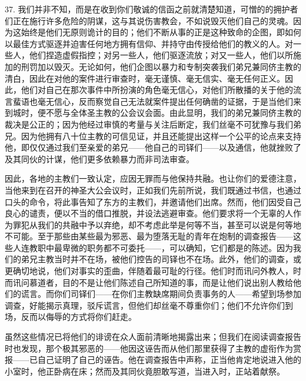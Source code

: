 37. 我们并非不知，而是在收到你们敬诚的信函之前就清楚知道，可憎的的拥护者们正在施行许多危险的阴谋，这与其说伤害教会，不如说毁灭他们自己的灵魂。因为这始终是他们无原则诡计的目的；他们不断从事的正是这种致命的企图，即如何以最佳方式驱逐并迫害任何地方拥有信仰、并持守由传授给他们的教义的人。对一些人，他们捏造虚假指控；对另一些人，他们驱逐流放；对又一些人，他们以所施加的刑罚加以毁灭。无论如何，他们企图以暴力和专制突袭我们弟兄兼同侪主教的清白，因此在对他的案件进行审查时，毫无谨慎、毫无信实、毫无任何正义。因此，他们对自己在那次事件中所扮演的角色毫无信心，对他们所散播的关于他的流言蜚语也毫无信心，反而察觉自己无法就案件提出任何确凿的证据，于是当他们来到城时，便不愿与全体圣主教的公会议会面。由此显明，我们的弟兄兼同侪主教的裁决是公正的；因为他经过审慎的考量与关注后断定，我们丝毫不可犹豫与我们弟兄。因为他拥有八十位主教的可信见证，并且还能提出这样一个公平的论点来支持他，即仅仅通过我们至亲爱的弟兄——他自己的司铎们——以及通信，他就挫败了及其同伙的计谋，他们更多依赖暴力而非司法审查。\par

因此，各地的主教们一致认定，应因无罪而与他保持共融。也让你们的爱德注意，当他来到在召开的神圣大公会议时，正如我们先前所说，我们既通过书信，也通过口头的命令，将此事告知了东方的主教们，并邀请他们出席。然而，他们因受自己良心的谴责，便以不当的借口推脱，并设法逃避审查。他们要求将一个无辜的人作为罪犯从我们的共融中予以弃绝，却不考虑此举是何等不当，甚至可以说是何等地不可能。至于那些由某些最为邪恶、最为堕落无耻的青年在炮制的调查报告——这些人连教职中最卑微的职务都不可委托——，可以确知，它们都是的陈述。因为我们的弟兄主教当时并不在场，被他们控告的司铎也不在场。此外，他们的调查，或更确切地说，他们对事实的歪曲，伴随着最可耻的行径。他们时而讯问外教人，时而讯问慕道者，目的不是让他们陈述自己所知道的事，而是让他们说出别人教给他们的谎言。而你们司铎们——在你们主教缺席期间负责事务的人——希望到场参加调查，好能揭示真理，驳斥谎言，但他们却丝毫不尊重你们；他们不允许你们到场，反而以侮辱的方式将你们赶走。\par

虽然这些情况已将他们的诽谤在众人面前清晰地揭露出来；但我们在阅读调查报告时也发现，那个极其邪恶的——他因这诬告而从他们那里获得了主教的虚衔作为赏报——已自己证明了自己的诬告。他在调查报告中声称，正当他肯定地说进入他的小室时，他正卧病在床；然而及其同伙竟胆敢写道，当进入时，正站着献祭。\par

